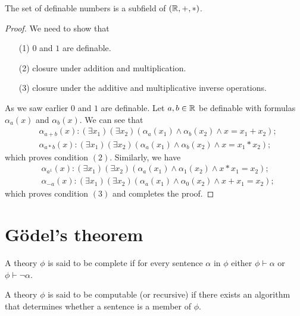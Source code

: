\documentclass[11pt,a4paper]{article}
\begin{document}
  \begin{proposition}
    The set of definable numbers is a subfield of $(\mathbb{R},+,*)$.
  \end{proposition}
  \begin{proof}
    We need to show that
    \begin{enumerate}
      \item[(1)] $0$ and $1$ are definable.
      \item[(2)] closure under addition and multiplication.
      \item[(3)] closure under the additive and multiplicative 
        inverse operations.
    \end{enumerate}
    As we saw earlier $0$ and $1$ are definable. Let $a,b \in \mathbb{R}$ be definable
    with formulas $\alpha_a(x)$ and $\alpha_b(x)$. We can see that
    \begin{align*}
      &\alpha_{a+b}(x) \colon (\exists x_1)(\exists x_2)
        (\alpha_a(x_1) \land \alpha_b(x_2) \land x = x_1 + x_2); \\
      &\alpha_{a*b}(x) \colon (\exists x_1)(\exists x_2)
        (\alpha_a(x_1) \land \alpha_b(x_2) \land x = x_1 * x_2);
    \end{align*}
    which proves condition $(2)$.
    Similarly, we have
    \begin{align*}
      &\alpha_{a^{1}}(x) \colon (\exists x_1)(\exists x_2)
        (\alpha_a(x_1) \land \alpha_1(x_2) \land x * x_1 = x_2); \\
      &\alpha_{-a}(x) \colon (\exists x_1)(\exists x_2)
        (\alpha_a(x_1) \land \alpha_0(x_2) \land x + x_1 = x_2);
    \end{align*}
    which proves condition $(3)$ and completes the proof.
  \end{proof}

  \section{Gödel's theorem}
  \begin{definition}
    A theory $\phi$ is said to be complete if for every sentence $\alpha$
    in $\phi$ either $\phi \vdash \alpha$ or $\phi \vdash \neg \alpha$.
  \end{definition}

  \begin{definition}
    A theory $\phi$ is said to be computable (or recursive) if there 
    exists an algorithm that determines whether a sentence is 
    a member of $\phi$.
  \end{definition}
\end{document}

